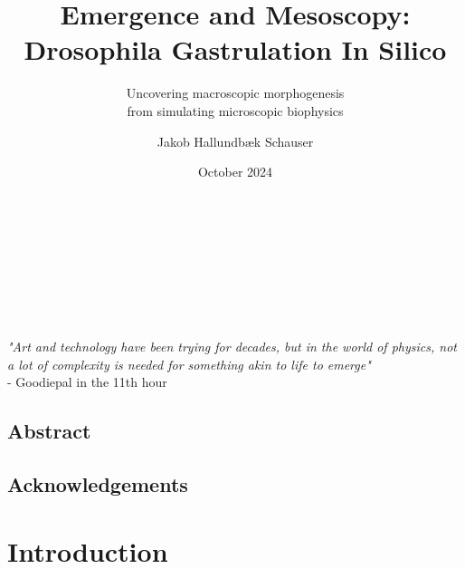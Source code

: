 \documentclass[12pt, oneside]{book}
\author{Jakob Hallundbæk Schauser}
\title{Emergence and Mesoscopy:\\ Drosophila Gastrulation In Silico}
\subtitle{Uncovering macroscopic morphogenesis\\ from simulating microscopic biophysics}
\date{October 2024}
\renewcommand{\headrulewidth}{0pt}
\newcommand\mymainpagestyle{%
\fancyhf{}      
\fancyhead[L]{\nouppercase{\footnotesize{\chaptername~ \thechapter~ |~ \leftmark}} \renewcommand{\headrulewidth}{0.4pt} \headrule \renewcommand{\headrulewidth}{0pt}}
\setlength{\headheight}{25pt}
\fancyfoot[C]{\thepage}
}
\begin{document}


\maketitle
\frontmatter %
\pagestyle{plain} %

\newpage \ \\\\\\\\\\\\\textit{"Art and technology have been trying for decades, but in the world of physics, not a lot of complexity is needed for something akin to life to emerge"} \\- Goodiepal in the 11th hour%

\section*{Abstract}
\label{sec:abstract}


\newpage
\section*{Acknowledgements}
\label{sec:acks}


\newpage
\tableofcontents
\newpage


\mainmatter 
\mymainpagestyle{} %

\chapter{Introduction}
\label{chap:intro}

\end{document}
